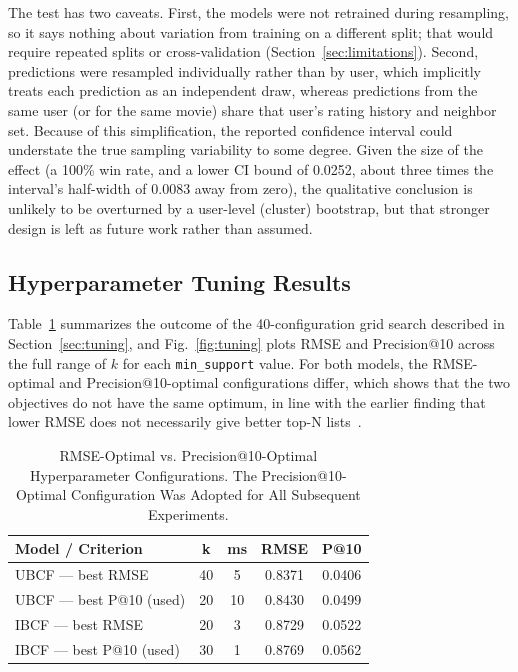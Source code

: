 \documentclass[conference]{IEEEtran}
\begin{document}
The test has two caveats. First, the models were not retrained during resampling, so it says nothing about variation from training on a different split; that would require repeated splits or cross-validation (Section~\ref{sec:limitations}). Second, predictions were resampled individually rather than by user, which implicitly treats each prediction as an independent draw, whereas predictions from the same user (or for the same movie) share that user's rating history and neighbor set. Because of this simplification, the reported confidence interval could understate the true sampling variability to some degree. Given the size of the effect (a 100\% win rate, and a lower CI bound of 0.0252, about three times the interval's half-width of 0.0083 away from zero), the qualitative conclusion is unlikely to be overturned by a user-level (cluster) bootstrap, but that stronger design is left as future work rather than assumed.

\subsection{Hyperparameter Tuning Results}
\label{sec:tuning-results}
Table~\ref{tab:tuning} summarizes the outcome of the 40-configuration grid search described in Section~\ref{sec:tuning}, and Fig.~\ref{fig:tuning} plots RMSE and Precision@10 across the full range of $k$ for each \texttt{min\_support} value. For both models, the RMSE-optimal and Precision@10-optimal configurations differ, which shows that the two objectives do not have the same optimum, in line with the earlier finding that lower RMSE does not necessarily give better top-N lists~\cite{cremonesi2010}.

\begin{table}[htbp]
\caption{RMSE-Optimal vs. Precision@10-Optimal Hyperparameter Configurations. The Precision@10-Optimal Configuration Was Adopted for All Subsequent Experiments.}
\begin{center}
\begin{tabular}{|l|c|c|c|c|}
\hline
\textbf{Model / Criterion} & \textbf{k} & \textbf{ms} & \textbf{RMSE} & \textbf{P@10} \\
\hline
UBCF --- best RMSE & 40 & 5 & 0.8371 & 0.0406 \\
\hline
UBCF --- best P@10 (used) & 20 & 10 & 0.8430 & 0.0499 \\
\hline
IBCF --- best RMSE & 20 & 3 & 0.8729 & 0.0522 \\
\hline
IBCF --- best P@10 (used) & 30 & 1 & 0.8769 & 0.0562 \\
\hline
\end{tabular}
\label{tab:tuning}
\end{center}
\end{table}
\end{document}
